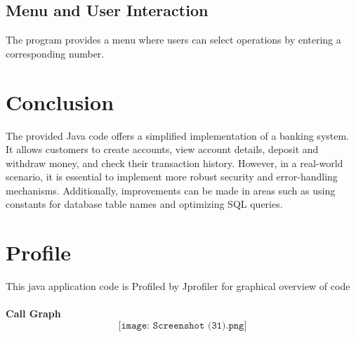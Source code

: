 \documentclass{article}
\begin{document}
\subsection{Menu and User Interaction}
The program provides a menu where users can select operations by entering a corresponding number.

\section{Conclusion}
The provided Java code offers a simplified implementation of a banking system. It allows customers to create accounts, view account details, deposit and withdraw money, and check their transaction history. However, in a real-world scenario, it is essential to implement more robust security and error-handling mechanisms. Additionally, improvements can be made in areas such as using constants for database table names and optimizing SQL queries.

\section{Profile}
This java application code is Profiled by Jprofiler for  graphical overview of code\\
\\
\textbf{Call Graph}
\[
  \texttt{[image: Screenshot (31).png]}
\]
\end{document}
